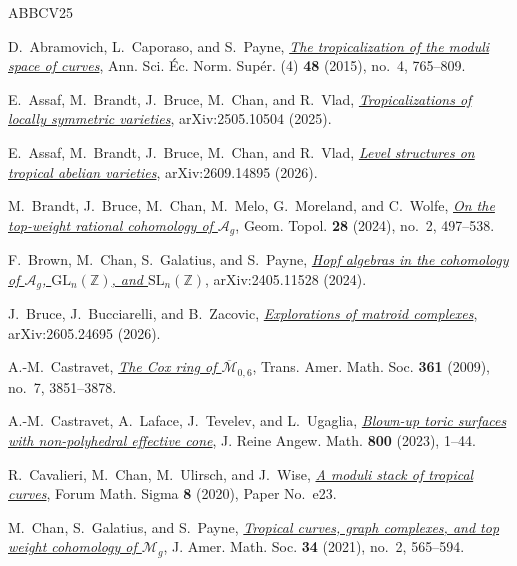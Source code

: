 \documentclass[11pt,reqno]{amsart}
\newcommand{\cA}{\mathcal{A}}
\newcommand{\cM}{\mathcal{M}}
\newcommand{\Mbar}{\overline{\mathcal{M}}}
\newcommand{\Z}{\mathbb{Z}}
\begin{document}
\clearpage
\begingroup
\small
\setlength{\parskip}{0pt}
\begin{thebibliography}{ABBCV25}
\setlength{\itemsep}{5pt}

D.~Abramovich, L.~Caporaso, and S.~Payne,
\emph{\href{https://www.numdam.org/item/ASENS_2015__48_4_765_0/}{The tropicalization of the moduli space of curves}},
Ann. Sci. \'Ec. Norm. Sup\'er. (4) \textbf{48} (2015), no.~4, 765--809.

E.~Assaf, M.~Brandt, J.~Bruce, M.~Chan, and R.~Vlad,
\emph{\href{https://arxiv.org/abs/2505.10504}{Tropicalizations of locally symmetric varieties}},
arXiv:2505.10504 (2025).

E.~Assaf, M.~Brandt, J.~Bruce, M.~Chan, and R.~Vlad,
\emph{\href{https://arxiv.org/abs/2609.14895}{Level structures on tropical abelian varieties}},
arXiv:2609.14895 (2026).

M.~Brandt, J.~Bruce, M.~Chan, M.~Melo, G.~Moreland, and C.~Wolfe,
\emph{\href{https://doi.org/10.2140/gt.2024.28.497}{On the top-weight rational cohomology of $\cA_g$}},
Geom. Topol. \textbf{28} (2024), no.~2, 497--538.

F.~Brown, M.~Chan, S.~Galatius, and S.~Payne,
\emph{\href{https://arxiv.org/abs/2405.11528}{Hopf algebras in the cohomology of $\cA_g$, $\mathrm{GL}_n(\Z)$, and $\mathrm{SL}_n(\Z)$}},
arXiv:2405.11528 (2024).

J.~Bruce, J.~Bucciarelli, and B.~Zacovic,
\emph{\href{https://arxiv.org/abs/2605.24695}{Explorations of matroid complexes}},
arXiv:2605.24695 (2026).

A.-M.~Castravet,
\emph{\href{https://doi.org/10.1090/S0002-9947-09-04641-8}{The Cox ring of $\Mbar_{0,6}$}},
Trans. Amer. Math. Soc. \textbf{361} (2009), no.~7, 3851--3878.

A.-M.~Castravet, A.~Laface, J.~Tevelev, and L.~Ugaglia,
\emph{\href{https://doi.org/10.1515/crelle-2023-0022}{Blown-up toric surfaces with non-polyhedral effective cone}},
J. Reine Angew. Math. \textbf{800} (2023), 1--44.

R.~Cavalieri, M.~Chan, M.~Ulirsch, and J.~Wise,
\emph{\href{https://doi.org/10.1017/fms.2020.16}{A moduli stack of tropical curves}},
Forum Math. Sigma \textbf{8} (2020), Paper No.~e23.

M.~Chan, S.~Galatius, and S.~Payne,
\emph{\href{https://doi.org/10.1090/jams/965}{Tropical curves, graph complexes, and top weight cohomology of $\cM_g$}},
J. Amer. Math. Soc. \textbf{34} (2021), no.~2, 565--594.


\end{thebibliography}
\end{document}

